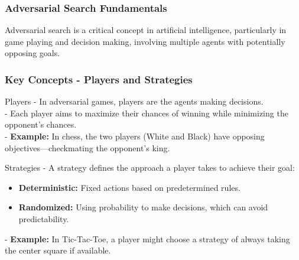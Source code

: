 \documentclass[aspectratio=169]{beamer}
\begin{document}
\begin{frame}[fragile]
    \frametitle{Adversarial Search Fundamentals}
    Adversarial search is a critical concept in artificial intelligence, particularly in game playing and decision making, involving multiple agents with potentially opposing goals.
\end{frame}

\begin{frame}[fragile]
    \frametitle{Key Concepts - Players and Strategies}
    \begin{block}{Players}
        - In adversarial games, players are the agents making decisions.\\
        - Each player aims to maximize their chances of winning while minimizing the opponent's chances.\\
        - \textbf{Example:} In chess, the two players (White and Black) have opposing objectives—checkmating the opponent's king.
    \end{block}
    
    \begin{block}{Strategies}
        - A strategy defines the approach a player takes to achieve their goal:
            \begin{itemize}
                \item \textbf{Deterministic:} Fixed actions based on predetermined rules.
                \item \textbf{Randomized:} Using probability to make decisions, which can avoid predictability.
            \end{itemize}
        - \textbf{Example:} In Tic-Tac-Toe, a player might choose a strategy of always taking the center square if available.
    \end{block}
\end{frame}
\end{document}
